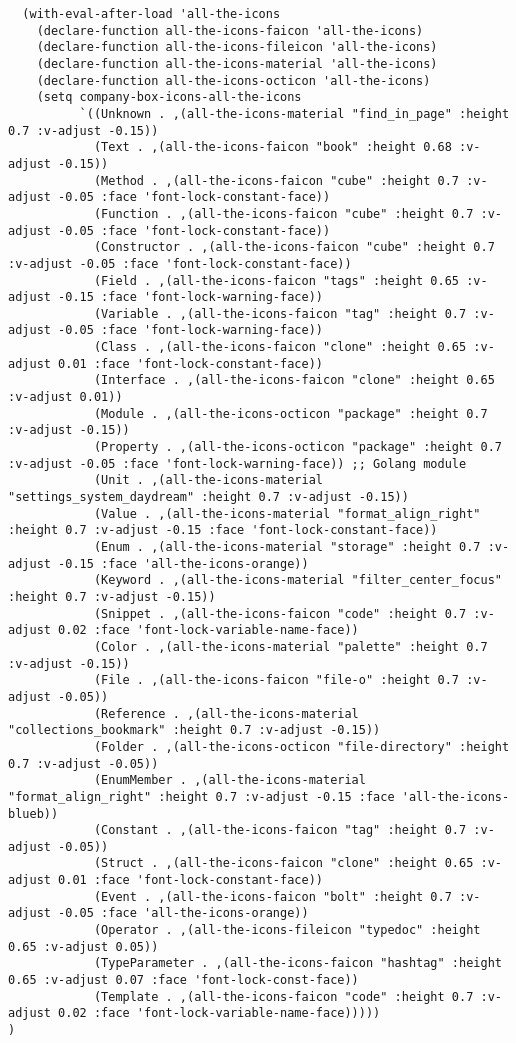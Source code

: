 \documentclass[11pt]{article}
\begin{document}
\begin{verbatim}
  (with-eval-after-load 'all-the-icons
    (declare-function all-the-icons-faicon 'all-the-icons)
    (declare-function all-the-icons-fileicon 'all-the-icons)
    (declare-function all-the-icons-material 'all-the-icons)
    (declare-function all-the-icons-octicon 'all-the-icons)
    (setq company-box-icons-all-the-icons
          `((Unknown . ,(all-the-icons-material "find_in_page" :height 0.7 :v-adjust -0.15))
            (Text . ,(all-the-icons-faicon "book" :height 0.68 :v-adjust -0.15))
            (Method . ,(all-the-icons-faicon "cube" :height 0.7 :v-adjust -0.05 :face 'font-lock-constant-face))
            (Function . ,(all-the-icons-faicon "cube" :height 0.7 :v-adjust -0.05 :face 'font-lock-constant-face))
            (Constructor . ,(all-the-icons-faicon "cube" :height 0.7 :v-adjust -0.05 :face 'font-lock-constant-face))
            (Field . ,(all-the-icons-faicon "tags" :height 0.65 :v-adjust -0.15 :face 'font-lock-warning-face))
            (Variable . ,(all-the-icons-faicon "tag" :height 0.7 :v-adjust -0.05 :face 'font-lock-warning-face))
            (Class . ,(all-the-icons-faicon "clone" :height 0.65 :v-adjust 0.01 :face 'font-lock-constant-face))
            (Interface . ,(all-the-icons-faicon "clone" :height 0.65 :v-adjust 0.01))
            (Module . ,(all-the-icons-octicon "package" :height 0.7 :v-adjust -0.15))
            (Property . ,(all-the-icons-octicon "package" :height 0.7 :v-adjust -0.05 :face 'font-lock-warning-face)) ;; Golang module
            (Unit . ,(all-the-icons-material "settings_system_daydream" :height 0.7 :v-adjust -0.15))
            (Value . ,(all-the-icons-material "format_align_right" :height 0.7 :v-adjust -0.15 :face 'font-lock-constant-face))
            (Enum . ,(all-the-icons-material "storage" :height 0.7 :v-adjust -0.15 :face 'all-the-icons-orange))
            (Keyword . ,(all-the-icons-material "filter_center_focus" :height 0.7 :v-adjust -0.15))
            (Snippet . ,(all-the-icons-faicon "code" :height 0.7 :v-adjust 0.02 :face 'font-lock-variable-name-face))
            (Color . ,(all-the-icons-material "palette" :height 0.7 :v-adjust -0.15))
            (File . ,(all-the-icons-faicon "file-o" :height 0.7 :v-adjust -0.05))
            (Reference . ,(all-the-icons-material "collections_bookmark" :height 0.7 :v-adjust -0.15))
            (Folder . ,(all-the-icons-octicon "file-directory" :height 0.7 :v-adjust -0.05))
            (EnumMember . ,(all-the-icons-material "format_align_right" :height 0.7 :v-adjust -0.15 :face 'all-the-icons-blueb))
            (Constant . ,(all-the-icons-faicon "tag" :height 0.7 :v-adjust -0.05))
            (Struct . ,(all-the-icons-faicon "clone" :height 0.65 :v-adjust 0.01 :face 'font-lock-constant-face))
            (Event . ,(all-the-icons-faicon "bolt" :height 0.7 :v-adjust -0.05 :face 'all-the-icons-orange))
            (Operator . ,(all-the-icons-fileicon "typedoc" :height 0.65 :v-adjust 0.05))
            (TypeParameter . ,(all-the-icons-faicon "hashtag" :height 0.65 :v-adjust 0.07 :face 'font-lock-const-face))
            (Template . ,(all-the-icons-faicon "code" :height 0.7 :v-adjust 0.02 :face 'font-lock-variable-name-face)))))
)
\end{verbatim}
\end{document}
